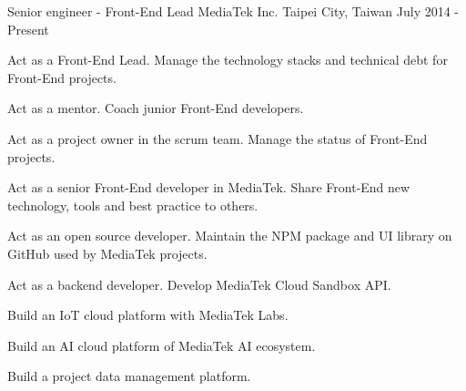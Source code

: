 

\begin{cventries}

  \cventry
    {Senior engineer - Front-End Lead} %
    {MediaTek Inc.} %
    {Taipei City, Taiwan} %
    {July 2014 - Present} %
    {
      \begin{cvitems} %
        \item {Act as a Front-End Lead. Manage the technology stacks and technical debt for Front-End projects.}
        \item {Act as a mentor. Coach junior Front-End developers.}
        \item {Act as a project owner in the scrum team. Manage the status of Front-End projects.}
        \item {Act as a senior Front-End developer in MediaTek. Share Front-End new technology, tools and best practice to others.}
        \item {Act as an open source developer. Maintain the NPM package and UI library on GitHub used by MediaTek projects.}
        \item {Act as a backend developer. Develop MediaTek Cloud Sandbox API.}
        \item {Build an IoT cloud platform with MediaTek Labs.}
        \item {Build an AI cloud platform of MediaTek AI ecosystem.}
        \item {Build a project data management platform.}
      \end{cvitems}
    }



\end{cventries}
